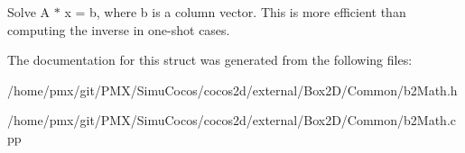 Solve A $\ast$ x = b, where b is a column vector. This is more efficient than computing the inverse in one-\/shot cases. 

The documentation for this struct was generated from the following files\+:\begin{DoxyCompactItemize}
\item 
/home/pmx/git/\+P\+M\+X/\+Simu\+Cocos/cocos2d/external/\+Box2\+D/\+Common/b2\+Math.\+h\item 
/home/pmx/git/\+P\+M\+X/\+Simu\+Cocos/cocos2d/external/\+Box2\+D/\+Common/b2\+Math.\+cpp\end{DoxyCompactItemize}
